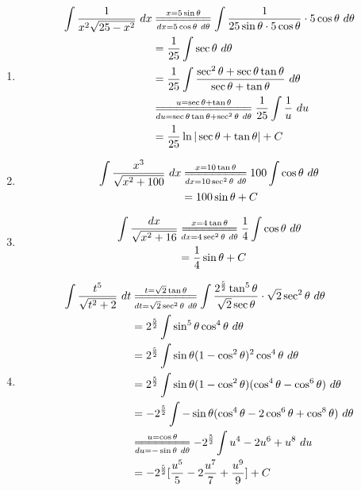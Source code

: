 \documentclass{article}
\begin{document}
\begin{enumerate}[label={\bf{}\arabic*}.]
\color{red}\item[\refstepcounter{enumi}\fbox{\number\value{enumi}.}]\color{black}%
	\begin{align*}
	\int\frac{1}{x^2\sqrt{25-x^2}}\ dx&\overset{x=5\sin\theta}{\underset{dx=5\cos\theta\ d\theta}{=\joinrel=\joinrel=\joinrel=\joinrel=\joinrel=\joinrel=\joinrel=}}\int\frac{1}{25\sin\theta\cdot5\cos\theta}\cdot5\cos\theta\ d\theta\\
	&=\frac{1}{25}\int\sec\theta\ d\theta\\
	&=\frac{1}{25}\int\frac{\sec^2\theta+\sec\theta\tan\theta}{\sec\theta+\tan\theta}\ d\theta\\
	&\overset{u=\sec\theta+\tan\theta}{\underset{du=\sec\theta\tan\theta+\sec^2\theta\ d\theta}{=\joinrel=\joinrel=\joinrel=\joinrel=\joinrel=\joinrel=\joinrel=\joinrel=\joinrel=\joinrel=\joinrel=\joinrel=\joinrel=}}\frac{1}{25}\int\frac{1}{u}\ du\\
	&=\frac{1}{25}\ln|\sec\theta+\tan\theta|+C
	\end{align*}

\item%
	\begin{align*}
	\int\frac{x^3}{\sqrt{x^2+100}}\ dx&\overset{x=10\tan\theta}{\underset{dx=10\sec^2\theta\ d\theta}{=\joinrel=\joinrel=\joinrel=\joinrel=\joinrel=\joinrel=\joinrel=\joinrel=}}100\int\cos\theta\ d\theta\\
	&=100\sin\theta+C
	\end{align*}

\item%
	\begin{align*}
	\int\frac{dx}{\sqrt{x^2+16}}&\overset{x=4\tan\theta}{\underset{dx=4\sec^2\theta\ d\theta}{=\joinrel=\joinrel=\joinrel=\joinrel=\joinrel=\joinrel=\joinrel=}}\frac{1}{4}\int\cos\theta\ d\theta\\
	&=\frac{1}{4}\sin\theta+C
	\end{align*}

\item%
	\begin{align*}
	\int\frac{t^5}{\sqrt{t^2+2}}\ dt&\overset{t=\sqrt{2}\tan\theta}{\underset{dt=\sqrt{2}\sec^2\theta\ d\theta}{=\joinrel=\joinrel=\joinrel=\joinrel=\joinrel=\joinrel=\joinrel=\joinrel=}}\int\frac{2^\frac{5}{2}\tan^5\theta}{\sqrt{2}\sec\theta}\cdot\sqrt{2}\sec^2\theta\ d\theta\\
	&=2^\frac{5}{2}\int\sin^5\theta\cos^4\theta\ d\theta\\
	&=2^\frac{5}{2}\int\sin\theta(1-\cos^2\theta)^2\cos^4\theta\ d\theta\\
	&=2^\frac{5}{2}\int\sin\theta(1-\cos^2\theta)(\cos^4\theta-\cos^6\theta)\ d\theta\\
	&=-2^\frac{5}{2}\int-\sin\theta(\cos^4\theta-2\cos^6\theta+\cos^8\theta)\ d\theta\\
	&\overset{u=\cos\theta}{\underset{du=-\sin\theta\ d\theta}{=\joinrel=\joinrel=\joinrel=\joinrel=\joinrel=\joinrel=\joinrel=}}-2^\frac{5}{2}\int u^4-2u^6+u^8\ du\\
	&=-2^\frac{5}{2}[\frac{u^5}{5}-2\frac{u^7}{7}+\frac{u^9}{9}]+C
	\end{align*}


\end{enumerate}
\end{document}
